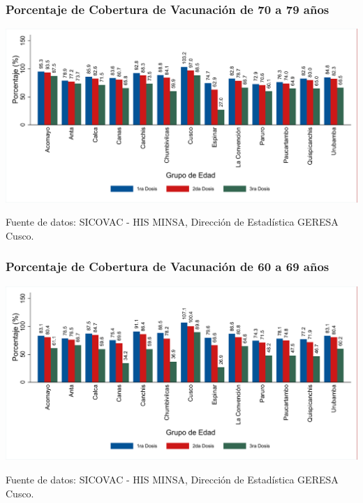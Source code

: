 \documentclass[xcolor=table]{beamer}
\begin{document}
\begin{frame}[label=vacunas_80]
	\frametitle{Porcentaje de Cobertura de Vacunación de 70 a 79 años}
	\vspace{-.5cm}
	\begin{center}
		\includegraphics[width=1.0\linewidth, trim={.2cm .5cm .2cm .2cm},clip]{../figuras/vacunacion_provincial_edad_practica_8.pdf}
	\end{center}
	{\tiny Fuente de datos: SICOVAC - HIS MINSA, Dirección de Estadística GERESA Cusco. \\}
	\hyperlink{cobertura_vacuna_provincias}{}
\end{frame}

\begin{frame}[label=vacunas_70]
	\frametitle{Porcentaje de Cobertura de Vacunación de 60 a 69 años}
	\vspace{-.5cm}
	\begin{center}
		\includegraphics[width=1.0\linewidth, trim={.2cm .5cm .2cm .2cm},clip]{../figuras/vacunacion_provincial_edad_practica_7.pdf}
	\end{center}
	{\tiny Fuente de datos: SICOVAC - HIS MINSA, Dirección de Estadística GERESA Cusco. \\}
\hyperlink{cobertura_vacuna_provincias}{}
\end{frame}
\end{document}
